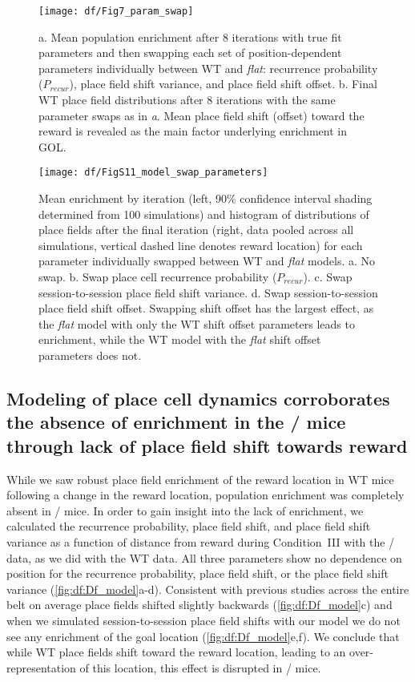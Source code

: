 \begin{figure}
	\centering
	\texttt{[image: df/Fig7\_param\_swap]}
	\caption[Place field shift towards the reward drives reward enrichment in model]{a. Mean population enrichment after 8 iterations with true fit parameters and then swapping each set of position-dependent parameters individually between WT and \emph{flat}: recurrence probability ($P_{recur}$), place field shift variance, and place field shift offset.
	b. Final WT place field distributions after 8 iterations with the same parameter swaps as in \emph{a}. Mean place field shift (offset) toward the reward is revealed as the main factor underlying enrichment in GOL.}
	\label{fig:df:param_swap}
\end{figure}

\begin{figure}
	\centering
	\texttt{[image: df/FigS11\_model\_swap\_parameters]}
	\caption[Model enrichment when swapping individual parameters between WT and \df/ values]{Mean enrichment by iteration (left, 90\% confidence interval shading determined from 100 simulations) and histogram of distributions of place fields after the final iteration (right, data pooled across all simulations, vertical dashed line denotes reward location) for each parameter individually swapped between WT and \emph{flat} models.
	a. No swap.
	b. Swap place cell recurrence probability ($P_{recur}$).
	c. Swap session-to-session place field shift variance.
	d. Swap session-to-session place field shift offset. Swapping shift offset has the largest effect, as the \emph{flat} model with only the WT shift offset parameters leads to enrichment, while the WT model with the \emph{flat} shift offset parameters does not.}
	\label{fig:df:swap_supp}
\end{figure}

\subsection{Modeling of place cell dynamics corroborates the absence of enrichment in the \df/ mice through lack of place field shift towards reward}
While we saw robust place field enrichment of the reward location in WT mice following a change in the reward location, population enrichment was completely absent in \df/ mice. In order to gain insight into the lack of enrichment, we calculated the recurrence probability, place field shift, and place field shift variance as a function of distance from reward during Condition~III with the \df/ data, as we did with the WT data. All three parameters show no dependence on position for the recurrence probability, place field shift, or the place field shift variance (\autoref{fig:df:Df_model}a-d). Consistent with previous studies \citep{Mehta1997} across the entire belt on average place fields shifted slightly backwards (\autoref{fig:df:Df_model}c) and when we simulated session-to-session place field shifts with our model we do not see any enrichment of the goal location (\autoref{fig:df:Df_model}e,f). We conclude that while WT place fields shift toward the reward location, leading to an over-representation of this location, this effect is disrupted in \df/ mice.

